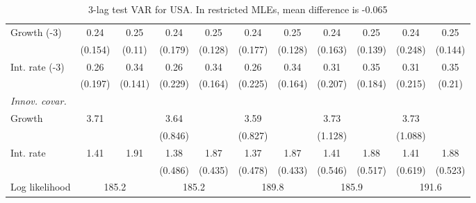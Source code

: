 \begin{table}[htbp]
\begin{tabular}{@{\extracolsep{4pt}}lcccccccccc@{}}
\quad Growth (-3) 	 &0.24 	 & 0.25 	 & 0.24 	 & 0.25 	 & 0.24 	 & 0.25 	 & 0.24 	 & 0.25 	 & 0.24 	 & 0.25	 \\ 
 		 & (0.154) 	 & (0.11) 	 & (0.179) 	 & (0.128) 	 & (0.177) 	 & (0.128) 	 & (0.163) 	 & (0.139) 	 & (0.248) 	 & (0.144) 	 \\ 
\quad Int. rate (-3) 	 &0.26 	 & 0.34 	 & 0.26 	 & 0.34 	 & 0.26 	 & 0.34 	 & 0.31 	 & 0.35 	 & 0.31 	 & 0.35	 \\ 
 		 & (0.197) 	 & (0.141) 	 & (0.229) 	 & (0.164) 	 & (0.225) 	 & (0.164) 	 & (0.207) 	 & (0.184) 	 & (0.215) 	 & (0.21) 	 \\ 
\rule{0pt}{4ex} \emph{Innov. covar.}  	 & 	 & 	 & 	 & 	 & 	 & 	 & 	 & 	 & 	 &\\ 
\quad Growth 	 &3.71 	 &  	 & 3.64 	 &  	 & 3.59 	 &  	 & 3.73 	 &  	 & 3.73 	 & 	 \\ 
 		 &  	 &  	 & (0.846) 	 &  	 & (0.827) 	 &  	 & (1.128) 	 &  	 & (1.088) 	 &  	 \\ 
\quad Int. rate 	 &1.41 	 & 1.91 	 & 1.38 	 & 1.87 	 & 1.37 	 & 1.87 	 & 1.41 	 & 1.88 	 & 1.41 	 & 1.88	 \\ 
 		 &  	 &  	 & (0.486) 	 & (0.435) 	 & (0.478) 	 & (0.433) 	 & (0.546) 	 & (0.517) 	 & (0.619) 	 & (0.523) 	 \\ 
 \hline \rule{0pt}{4ex} 
  Log likelihood 	 &\multicolumn{2}{c}{185.2} 	 & \multicolumn{2}{c}{185.2} 	 & \multicolumn{2}{c}{189.8} 	 & \multicolumn{2}{c}{185.9} 	 & \multicolumn{2}{c}{191.6}\\ 

 \hline 	\end{tabular}		\caption{3-lag test VAR for USA. In restricted MLEs, mean difference is -0.065}
		\label{tab:USA3lag}

\end{table}
